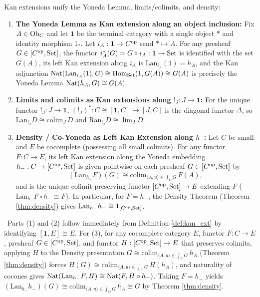 \documentclass[10pt,a4paper]{article}
\begin{document}
\begin{theorem}\label{thm:kan_unification}
Kan extensions unify the Yoneda Lemma, limits/colimits, and density:
\begin{enumerate}
\item \textbf{The Yoneda Lemma as Kan extension along an object inclusion:} Fix $A \in {\textrm{Ob}}_C$ and let $\mathbf{1}$ be the terminal category with a single object $*$ and identity morphism $1_*$. Let $i_A : \mathbf{1} \to C^{\textrm{op}}$ send $* \mapsto A$. For any presheaf $G \in [C^{\textrm{op}}, {\textrm{Set}}]$, the functor $i_A^*(G) = G \circ i_A : \mathbf{1} \to {\textrm{Set}}$ is identified with the set $G(A)$, its left Kan extension along $i_A$ is $\mathrm{Lan}_{i_A}(1) = h_A$, and the Kan adjunction ${\textrm{Nat}}(\mathrm{Lan}_{i_A}(1), G) \cong {\textrm{Hom}}_{\textrm{Set}}(1, G(A)) \cong G(A)$ is precisely the Yoneda Lemma ${\textrm{Nat}}(h_A, G) \cong G(A)$.
\item \textbf{Limits and colimits as Kan extensions along $!_J : J \to \mathbf{1}$:} For the unique functor $!_J : J \to \mathbf{1}$, $(!_J)^* : C \cong [\mathbf{1}, C] \to [J, C]$ is the diagonal functor $\Delta$, so $\mathrm{Lan}_{!_J} D \cong \mathrm{colim}_J\, D$ and $\mathrm{Ran}_{!_J} D \cong \lim_J D$.
\item \textbf{Density / Co-Yoneda as Left Kan Extension along $h_-$:} Let $C$ be small and $E$ be cocomplete (possessing all small colimits). For any functor $F : C \to E$, its left Kan extension along the Yoneda embedding $h_- : C \to [C^{\textrm{op}}, {\textrm{Set}}]$ is given pointwise on each presheaf $G \in [C^{\textrm{op}}, {\textrm{Set}}]$ by
$$\left(\mathrm{Lan}_{h_-} F\right)(G) \cong \mathrm{colim}_{\langle A, u \rangle \in \int_C G}\, F(A),$$
and is the unique colimit-preserving functor $[C^{\textrm{op}}, {\textrm{Set}}] \to E$ extending $F$ ($\mathrm{Lan}_{h_-} F \circ h_- \cong F$). In particular, for $F = h_-$, the Density Theorem (Theorem \ref{thm:density}) gives $\mathrm{Lan}_{h_-} h_- \cong 1_{[C^{\textrm{op}}, {\textrm{Set}}]}$.
\end{enumerate}
\end{theorem}
\myprf\ Parts (1) and (2) follow immediately from Definition \ref{def:kan_ext} by identifying $[\mathbf{1}, E] \cong E$. For (3), for any cocomplete category $E$, functor $F : C \to E$, presheaf $G \in [C^{\textrm{op}}, {\textrm{Set}}]$, and functor $H : [C^{\textrm{op}}, {\textrm{Set}}] \to E$ that preserves colimits, applying $H$ to the Density presentation $G \cong \mathrm{colim}_{\langle A, u \rangle \in \int_C G}\, h_A$ (Theorem \ref{thm:density}) forces $H(G) \cong \mathrm{colim}_{\langle A, u \rangle \in \int_C G}\, H(h_A)$, and naturality of cocones gives ${\textrm{Nat}}(\mathrm{Lan}_{h_-} F, H) \cong {\textrm{Nat}}(F, H \circ h_-)$. Taking $F = h_-$ yields $(\mathrm{Lan}_{h_-} h_-)(G) \cong \mathrm{colim}_{\langle A, u \rangle \in \int_C G}\, h_A \cong G$ by Theorem \ref{thm:density}. \myqed
\end{document}
